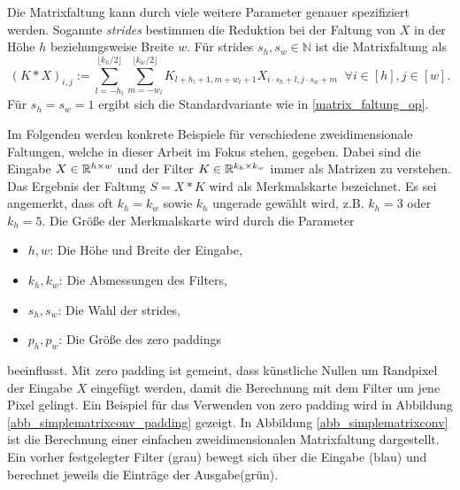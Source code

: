 \begin{bem}\label{bem_strides}
    Die Matrixfaltung kann durch viele weitere Parameter genauer spezifiziert werden. Sogannte \textit{strides} bestimmen die Reduktion bei der Faltung von $X$ in der Höhe $h$ beziehungsweise Breite $w$. Für strides $s_h, s_w \in \mathbb{N}$ ist die Matrixfaltung als
    \begin{equation*}
        (K \ast X)_{i,j}:=\sum_{l=-h_l}^{\lfloor k_h/2  \rfloor} \sum_{m=-w_l}^{\lfloor k_w/2 \rfloor} K_{l+h_l+1, m+w_l+1} X_{i \cdot s_h +l,j \cdot s_w +m} \; \; \forall i \in [h], j \in [w].
    \end{equation*}
    Für $s_h=s_w=1$ ergibt sich die Standardvariante wie in \ref{matrix_faltung_op}.
    \end{bem}

Im Folgenden werden konkrete Beispiele für verschiedene zweidimensionale Faltungen, welche in dieser Arbeit im Fokus stehen, gegeben. Dabei sind die Eingabe $X \in \mathbb{R}^{h \times w}$ und der Filter $K \in \mathbb{R}^{k_h \times k_w}$ immer als Matrizen zu verstehen. Das Ergebnis der Faltung $S= X \ast K$ wird als Merkmalskarte bezeichnet. Es sei angemerkt, dass oft $k_h=k_w$ sowie $k_h$ ungerade gewählt wird, z.B. $k_h=3$ oder $k_h=5$. Die Größe der Merkmalskarte wird durch die Parameter
\begin{itemize}
    \item $h,w$: Die Höhe und Breite der Eingabe,
    \item $k_h, k_w$: Die Abmessungen des Filters,
    \item $s_h, s_w$: Die Wahl der strides, 
    \item $p_h, p_w$: Die Größe des zero paddings
\end{itemize}
beeinflusst. Mit zero padding ist gemeint, dass künstliche Nullen um Randpixel der Eingabe $X$ eingefügt werden, damit die Berechnung mit dem Filter um jene Pixel gelingt. Ein Beispiel für das Verwenden von zero padding wird in Abbildung \ref{abb_simplematrixconv_padding} gezeigt. In Abbildung \ref{abb_simplematrixconv} ist die Berechnung einer einfachen zweidimensionalen Matrixfaltung dargestellt. Ein vorher festgelegter Filter (grau) bewegt sich über die Eingabe (blau) und berechnet jeweils die Einträge der Ausgabe(grün). 

